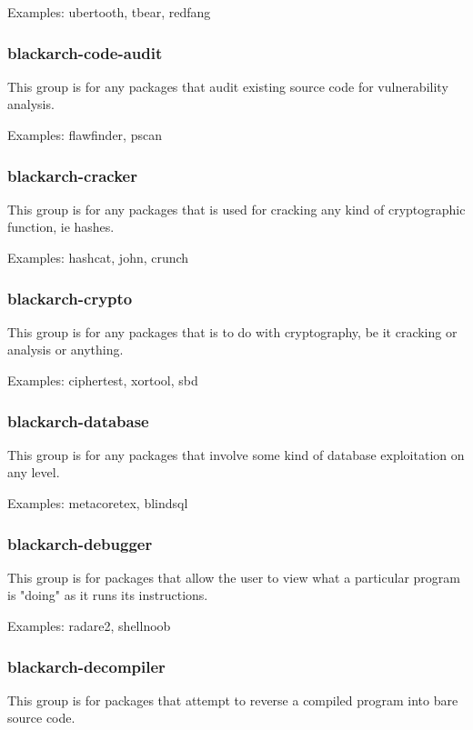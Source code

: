 \documentclass[a4paper, oneside, 11pt]{book}
\begin{document}
Examples: ubertooth, tbear, redfang

\subsubsection{blackarch-code-audit}

This group is for any packages that audit existing source code for vulnerability analysis.

Examples: flawfinder, pscan

\subsubsection{blackarch-cracker}

This group is for any packages that is used for cracking any kind of cryptographic function, ie hashes.

Examples: hashcat, john, crunch

\subsubsection{blackarch-crypto}

This group is for any packages that is to do with cryptography, be it cracking or analysis or anything.

Examples: ciphertest, xortool, sbd

\subsubsection{blackarch-database}

This group is for any packages that involve some kind of database exploitation on any level.

Examples: metacoretex, blindsql

\subsubsection{blackarch-debugger}

This group is for packages that allow the user to view what a particular program is "doing" as it runs its instructions.

Examples: radare2, shellnoob

\subsubsection{blackarch-decompiler}

This group is for packages that attempt to reverse a compiled program into bare source code.
\end{document}

